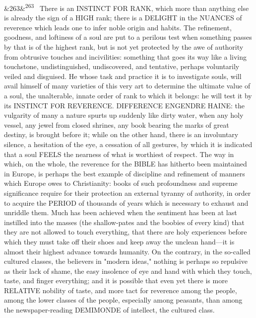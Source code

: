 \documentclass[12pt]{article}
\newcommand{\para}[1][]{\par\noindent\ifx&#1&\else\textsuperscript{\footnotesize #1}~\fi}
\begin{document}
\para[263] There is an INSTINCT FOR RANK, which more than anything else is already the sign of a HIGH rank; there is a DELIGHT in the NUANCES of reverence which leads one to infer noble origin and habits. The refinement, goodness, and loftiness of a soul are put to a perilous test when something passes by that is of the highest rank, but is not yet protected by the awe of authority from obtrusive touches and incivilities: something that goes its way like a living touchstone, undistinguished, undiscovered, and tentative, perhaps voluntarily veiled and disguised. He whose task and practice it is to investigate souls, will avail himself of many varieties of this very art to determine the ultimate value of a soul, the unalterable, innate order of rank to which it belongs: he will test it by its INSTINCT FOR REVERENCE. DIFFERENCE ENGENDRE HAINE: the vulgarity of many a nature spurts up suddenly like dirty water, when any holy vessel, any jewel from closed shrines, any book bearing the marks of great destiny, is brought before it; while on the other hand, there is an involuntary silence, a hesitation of the eye, a cessation of all gestures, by which it is indicated that a soul FEELS the nearness of what is worthiest of respect. The way in which, on the whole, the reverence for the BIBLE has hitherto been maintained in Europe, is perhaps the best example of discipline and refinement of manners which Europe owes to Christianity: books of such profoundness and supreme significance require for their protection an external tyranny of authority, in order to acquire the PERIOD of thousands of years which is necessary to exhaust and unriddle them. Much has been achieved when the sentiment has been at last instilled into the masses (the shallow-pates and the boobies of every kind) that they are not allowed to touch everything, that there are holy experiences before which they must take off their shoes and keep away the unclean hand---it is almost their highest advance towards humanity. On the contrary, in the so-called cultured classes, the believers in "modern ideas," nothing is perhaps so repulsive as their lack of shame, the easy insolence of eye and hand with which they touch, taste, and finger everything; and it is possible that even yet there is more RELATIVE nobility of taste, and more tact for reverence among the people, among the lower classes of the people, especially among peasants, than among the newspaper-reading DEMIMONDE of intellect, the cultured class.
\end{document}
